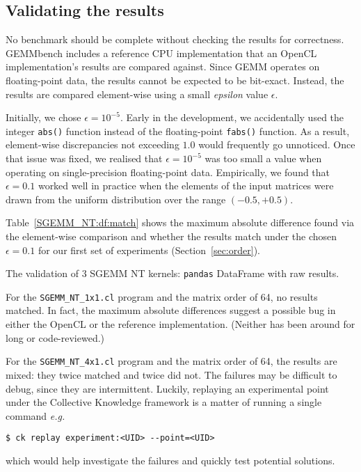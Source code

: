\documentclass{acm_proc_article-sp} %
\begin{document}
\subsection{Validating the results}
\label{sec:validating}

No benchmark should be complete without checking the results for correctness.
%
GEMMbench includes a reference CPU implementation that an OpenCL
implementation's results are compared against.
%
Since GEMM operates on floating-point data, the results cannot be expected to be
bit-exact.
%
Instead, the results are compared element-wise using a small {\em epsilon}
value $\epsilon$.

Initially, we chose $\epsilon = 10^{-5}$.
%
Early in the development, we accidentally used the integer \verb|abs()|
function instead of the floating-point \verb|fabs()| function.
%
As a result, element-wise discrepancies not exceeding $1.0$ would frequently go
unnoticed.
%
Once that issue was fixed, we realised that $\epsilon = 10^{-5}$ was too small
a value when operating on single-precision floating-point data.
%
Empirically, we found that $\epsilon = 0.1$ worked well in practice when the
elements of the input matrices were drawn from the uniform distribution over
the range $(-0.5, +0.5)$.
%

Table~\ref{SGEMM_NT:df:match} shows the maximum absolute difference found via
the element-wise comparison and whether the results match under the chosen
$\epsilon = 0.1$ for our first set of experiments (Section~\ref{sec:order}).

\begin{sidewaystable*}
  \centering
  \caption{\label{SGEMM_NT:df:match}The validation of 3 SGEMM NT kernels: {\tt pandas} DataFrame with raw results.}
  
\end{sidewaystable*}

For the \verb|SGEMM_NT_1x1.cl| program and the matrix order of 64, no results
matched.
%
In fact, the maximum absolute differences suggest a possible bug in either the
OpenCL or the reference implementation. (Neither has been around for long or
code-reviewed.)

For the \verb|SGEMM_NT_4x1.cl| program and the matrix order of 64, the results
are mixed: they twice matched and twice did not.
%
The failures may be difficult to debug, since they are intermittent.
%
Luckily, replaying an experimental point under the Collective Knowledge framework is
a matter of running a single command {\em e.g.}\:
%
\begin{verbatim}
$ ck replay experiment:<UID> --point=<UID>
\end{verbatim}
%
which would help investigate the failures and quickly test potential solutions.
\end{document}
